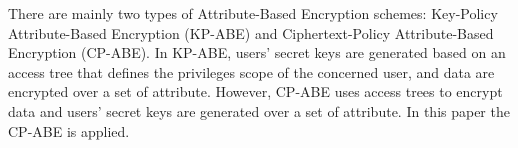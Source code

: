 There are mainly two types of Attribute-Based Encryption schemes: Key-Policy Attribute-Based Encryption (KP-ABE)\cite{goyal2006attribute} and Ciphertext-Policy Attribute-Based Encryption (CP-ABE).\cite{bethencourt2007ciphertext} In KP-ABE, users' secret keys are generated based on an access tree that defines the privileges scope of the concerned user, and data are encrypted over a set of attribute. However, CP-ABE uses access trees to encrypt data and users' secret keys are generated over a set of attribute. In this paper the CP-ABE is applied.



